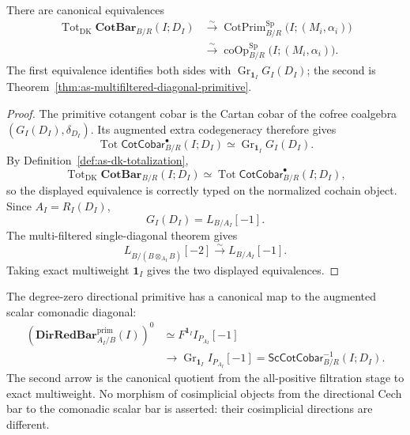 \begin{proposition}
\label{prop:as-cotbar-totalization}
There are canonical equivalences
\[
\boxed{
\begin{aligned}
    \operatorname{Tot}_{\mathrm{DK}}
    \mathbf{CotBar}_{B/R}(I;D_I)
    &\xrightarrow{\sim}
    \operatorname{CotPrim}^{\mathrm{Sp}}_{B/R}
    \bigl(I;(M_i,\alpha_i)\bigr)\\
    &\xrightarrow{\sim}
    \operatorname{coOp}^{\mathrm{Sp}}_{B/R}
    \bigl(I;(M_i,\alpha_i)\bigr).
\end{aligned}}
\]
The first equivalence identifies both sides with
$\operatorname{Gr}_{\mathbf1_I}G_I(D_I)$; the second is
Theorem~\ref{thm:as-multifiltered-diagonal-primitive}.
\end{proposition}

\begin{proof}
The primitive cotangent cobar is the Cartan cobar of the cofree coalgebra
$(G_I(D_I),\delta_{D_I})$.  Its augmented extra codegeneracy therefore gives
\[
    \operatorname*{Tot}
    \mathsf{CotCobar}^{\bullet}_{B/R}(I;D_I)
    \simeq
    \operatorname{Gr}_{\mathbf1_I}G_I(D_I).
\]
By Definition~\ref{def:as-dk-totalization},
\[
    \operatorname{Tot}_{\mathrm{DK}}
    \mathbf{CotBar}_{B/R}(I;D_I)
    \simeq
    \operatorname*{Tot}
    \mathsf{CotCobar}^{\bullet}_{B/R}(I;D_I),
\]
so the displayed equivalence is correctly typed on the normalized cochain
object.
Since $A_I=R_I(D_I)$,
\[
    G_I(D_I)=L_{B/A_I}[-1].
\]
The multi-filtered single-diagonal theorem gives
\[
    L_{B/(B\otimes_{A_I}B)}[-2]
    \xrightarrow{\sim}
    L_{B/A_I}[-1].
\]
Taking exact multiweight $\mathbf1_I$ gives the two displayed equivalences.
\end{proof}

\begin{proposition}
\label{prop:as-directional-diagonal-meeting}
The degree-zero directional primitive has a canonical map to the augmented
scalar comonadic diagonal:
\[
\boxed{
\begin{aligned}
    \left(\mathbf{DirRedBar}^{\mathrm{prim}}_{A_I/B}(I)\right)^0
    &\simeq
    F^{\mathbf1_I}I_{P_{A_I}}[-1]\\
    &\longrightarrow
    \operatorname{Gr}_{\mathbf1_I}I_{P_{A_I}}[-1]
    =
    \mathsf{ScCotCobar}^{-1}_{B/R}(I;D_I).
\end{aligned}}
\]
The second arrow is the canonical quotient from the all-positive filtration
stage to exact multiweight.  No morphism of cosimplicial objects from the
directional Cech bar to the comonadic scalar bar is asserted: their
cosimplicial directions are different.
\end{proposition}


